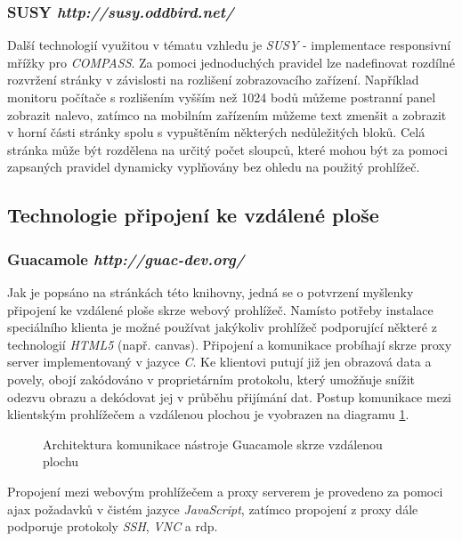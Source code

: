 \subsubsection*{\textbf{SUSY} \hfill \emph{http://susy.oddbird.net/}}
\label{subsec:susy}
Další technologií využitou v tématu vzhledu je \emph{SUSY} - implementace responsivní mřížky pro \emph{COMPASS}. Za pomoci jednoduchých pravidel lze nadefinovat rozdílné rozvržení stránky v závislosti na rozlišení zobrazovacího zařízení. Například monitoru počítače s rozlišením vyšším než 1024 bodů můžeme postranní panel zobrazit nalevo, zatímco na mobilním zařízením můžeme text zmenšit a zobrazit v horní části stránky spolu s vypuštěním některých nedůležitých bloků. Celá stránka může být rozdělena na určitý počet sloupců, které mohou být za pomoci zapsaných pravidel dynamicky vyplňovány bez ohledu na použitý prohlížeč.

\subsection{Technologie připojení ke vzdálené ploše}

\subsubsection*{\textbf{Guacamole} \hfill \emph{http://guac-dev.org/}}
\label{subsec:guacamole}
Jak je popsáno na stránkách této knihovny, jedná se o potvrzení myšlenky připojení ke vzdálené ploše skrze webový prohlížeč. Namísto potřeby instalace speciálního klienta je možné používat jakýkoliv prohlížeč podporující některé z technologií \emph{HTML5} (např. canvas). Připojení a komunikace probíhají skrze proxy server implementovaný v jazyce \emph{C}. Ke klientovi putují již jen obrazová data a povely, obojí zakódováno v proprietárním protokolu, který umožňuje snížit odezvu obrazu a dekódovat jej v průběhu přijímání dat. Postup komunikace mezi klientským prohlížečem a vzdálenou plochou je vyobrazen na diagramu \ref{fig:arch_core}.

\begin{figure}[htp] 
  \caption{Architektura komunikace nástroje Guacamole skrze vzdálenou plochu}
  \label{fig:arch_core}
\end{figure}  

Propojení mezi webovým prohlížečem a proxy serverem je provedeno za pomoci \gls{ajax} požadavků v čistém jazyce \emph{JavaScript}, zatímco propojení z proxy dále podporuje protokoly \emph{SSH}, \emph{VNC} a \gls{rdp}.

